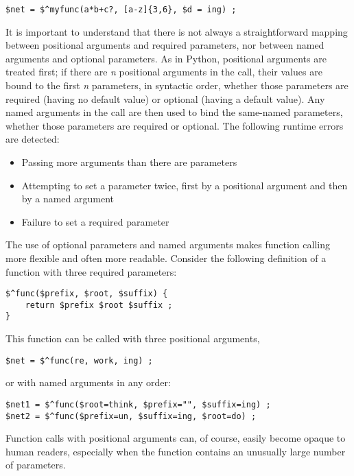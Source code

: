 \begin{Verbatim}
$net = $^myfunc(a*b+c?, [a-z]{3,6}, $d = ing) ;
\end{Verbatim}

\noindent
It is important to understand that there is not always a straightforward mapping
between positional arguments and required parameters, nor between named
arguments and optional parameters.  As in Python, positional arguments
are treated first; if there are \emph{n} positional arguments in the
call, their
values are bound to the first \emph{n} parameters, in syntactic order,
whether those
parameters are required (having no default value) or optional (having a
default value).  Any named arguments in the call are then used
to bind the same-named parameters, whether those parameters are
required or optional.  The following runtime errors are detected:

\begin{itemize}
\item
Passing more arguments than there are parameters
\item
Attempting to set a parameter twice, first by a positional argument and
then by a named argument
\item
Failure to set a required parameter
\end{itemize}

The use of optional parameters and named arguments makes function calling more flexible and
often more readable.  Consider the following definition of a function
with three required parameters:

\begin{Verbatim}
$^func($prefix, $root, $suffix) {
	return $prefix $root $suffix ;
}
\end{Verbatim}

\noindent
This function can be called with three positional arguments,

\begin{Verbatim}
$net = $^func(re, work, ing) ;
\end{Verbatim}

\noindent
or with named arguments in any order:

\begin{Verbatim}
$net1 = $^func($root=think, $prefix="", $suffix=ing) ;
$net2 = $^func($prefix=un, $suffix=ing, $root=do) ;
\end{Verbatim}

\noindent
Function calls with positional arguments can, of course, easily become
opaque to human readers, especially when the function contains an unusually large number of parameters.


